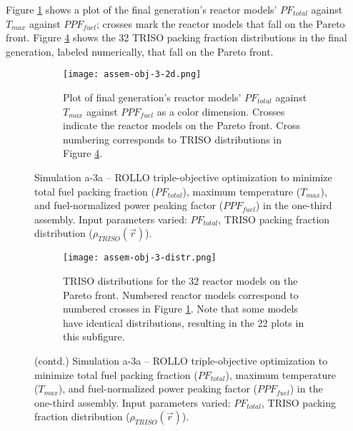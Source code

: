 Figure \ref{fig:assem-obj-3-2d} shows a plot of the final generation's reactor models' 
$PF_{total}$ against $T_{max}$ against $PPF_{fuel}$; crosses mark the reactor models 
that fall on the Pareto front.
Figure \ref{fig:assem-obj-3-distr} shows the 32 TRISO packing fraction distributions in 
the final generation, labeled numerically, that fall on the Pareto front. 
\begin{figure}[htbp!]
    \begin{subfigure}{\textwidth}
        \centering
        \texttt{[image: assem-obj-3-2d.png]}
        \caption{Plot of final generation's reactor models' $PF_{total}$ against 
        $T_{max}$ against $PPF_{fuel}$ as a color dimension. 
        Crosses indicate the reactor models on the 
        Pareto front. Cross numbering corresponds to TRISO distributions in Figure 
        \ref{fig:assem-obj-3-distr}.}
        \label{fig:assem-obj-3-2d} 
    \end{subfigure}
    \caption{Simulation a-3a -- ROLLO triple-objective optimization to minimize total 
    fuel packing fraction ($PF_{total}$), maximum temperature ($T_{max}$), and 
    fuel-normalized power peaking factor ($PPF_{fuel}$) in the one-third assembly. 
    Input parameters varied: $PF_{total}$, TRISO packing fraction distribution
    ($\rho_{TRISO}(\vec{r})$).}
    \label{fig:assem-obj-3}
\end{figure}
\begin{figure}[htbp!]
    \ContinuedFloat
    \begin{subfigure}{\textwidth}
        \centering
        \texttt{[image: assem-obj-3-distr.png]}
        \caption{TRISO distributions for the 32 reactor models on the Pareto front.
        Numbered reactor models correspond to numbered crosses in Figure 
        \ref{fig:assem-obj-3-2d}. 
        Note that some models have identical distributions, resulting in the 22 plots 
        in this subfigure.}
        \label{fig:assem-obj-3-distr} 
    \end{subfigure}
    \caption{(contd.) Simulation a-3a -- ROLLO triple-objective optimization to minimize 
    total fuel packing fraction ($PF_{total}$), maximum temperature ($T_{max}$),
    and fuel-normalized power peaking factor ($PPF_{fuel}$) in the one-third assembly.  
    Input parameters varied: $PF_{total}$, TRISO packing fraction distribution
    ($\rho_{TRISO}(\vec{r})$).}
\end{figure}

